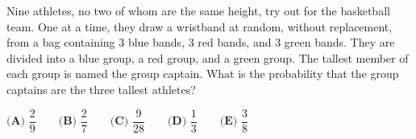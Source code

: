 Nine athletes, no two of whom are the same height, try out for the basketball team. One at a time, they draw a wristband at random, without replacement, from a bag containing 3 blue bands, 3 red bands, and 3 green bands. They are divided into a blue group, a red group, and a green group. The tallest member of each group is named the group captain. What is the probability that the group captains are the three tallest athletes?



$\textbf{(A) } \dfrac{2}{9} \qquad \textbf{(B) } \dfrac{2}{7} \qquad \textbf{(C) } \dfrac{9}{28} \qquad \textbf{(D) } \dfrac{1}{3}  \qquad \textbf{(E) } \dfrac{3}{8}$




